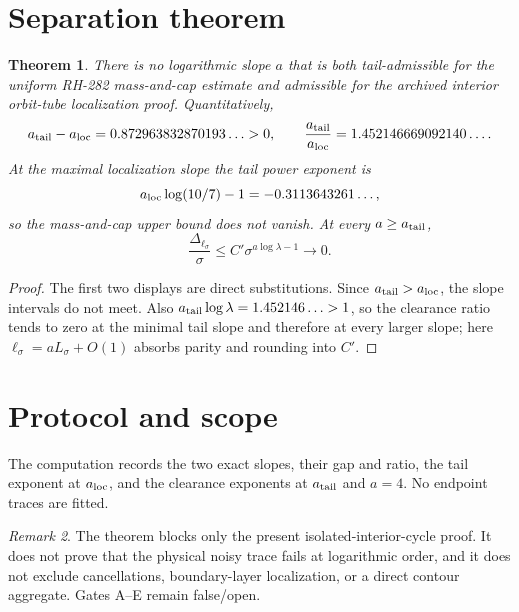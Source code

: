 \documentclass[11pt]{article}
\newtheorem{theorem}{Theorem}[section]
\theoremstyle{remark}\newtheorem{remark}[theorem]{Remark}
\begin{document}
\section{Separation theorem}
\begin{theorem}\label{thm:gap}
There is no logarithmic slope $a$ that is both tail-admissible for the
uniform RH-282 mass-and-cap estimate and admissible for the archived
interior orbit-tube localization proof.  Quantitatively,
\[
 a_{\rm tail}-a_{\rm loc}
 =0.872963832870193\ldots>0,
\qquad
 \frac{a_{\rm tail}}{a_{\rm loc}}
 =1.452146669092140\ldots.
\]
At the maximal localization slope the tail power exponent is
\[
 a_{\rm loc}\log(10/7)-1=-0.3113643261\ldots,
\]
so the mass-and-cap upper bound does not vanish.  At every
$a\ge a_{\rm tail}$,
\[
 \frac{\Delta_{\ell_\sigma}}{\sigma}
 \le C'\sigma^{a\log\lambda-1}\longrightarrow0.
\]
\end{theorem}
\begin{proof}
The first two displays are direct substitutions.  Since
$a_{\rm tail}>a_{\rm loc}$, the slope intervals do not meet.  Also
$a_{\rm tail}\log\lambda=1.452146\ldots>1$, so the clearance ratio tends to
zero at the minimal tail slope and therefore at every larger slope; here
$\ell_\sigma=aL_\sigma+O(1)$ absorbs parity and rounding into $C'$.
\end{proof}

\section{Protocol and scope}
The computation records the two exact slopes, their gap and ratio, the tail
exponent at $a_{\rm loc}$, and the clearance exponents at
$a_{\rm tail}$ and $a=4$.  No endpoint traces are fitted.

\begin{remark}
The theorem blocks only the present isolated-interior-cycle proof.  It does
not prove that the physical noisy trace fails at logarithmic order, and it
does not exclude cancellations, boundary-layer localization, or a direct
contour aggregate.  Gates A--E remain false/open.
\end{remark}
\end{document}
